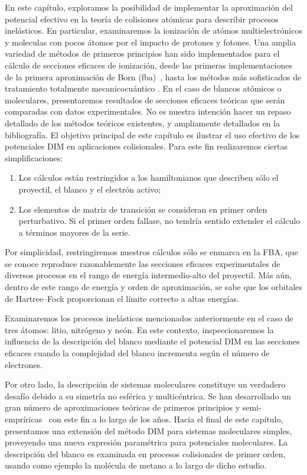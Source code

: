 En este capítulo, exploramos la posibilidad de implementar la 
aproximación del potencial efectivo en la teoría de colisiones atómicas 
para describir procesos inelásticos. En particular, examinaremos la 
ionización de atómos multielectrónicos y moleculas con pocos átomos por 
el impacto de protones y fotones. 
Una amplia variedad de métodos de primeros principios han sido 
implementados para el cálculo de secciones eficaces de ionización, 
desde las primeras implementaciones de la primera aproximación de Born (\acs{fba})~\cite{Bates:62,McDowell:61}, hasta los métodos más 
sofisticados de tratamiento totalmente mecanicocuántico 
\cite{Pindzola:07,Burke:11,Bray:17,Pindzola:16}. En el caso de 
blancos atómicos o moleculares, presentaremos resultados de secciones 
eficaces teóricas que serán comparadas con datos experimentales. No es 
nuestra intención hacer un repaso detallado de los métodos teóricos 
existentes, y ampliamente detallados en la bibliografía. El objetivo 
principal de este capítulo es ilustrar el uso efectivo de los 
potenciales DIM en aplicaciones colisionales. Para este fin realizaremos 
ciertas simplificaciones: 
\begin{enumerate}
\item Los cálculos están restringidos a los hamiltonianos que describen
sólo el proyectil, el blanco y el electrón activo;
\item Los elementos de matriz de transición se consideran en primer 
orden perturbativo. Si el primer orden fallase, no tendría sentido 
extender el cálculo a términos mayores de la serie. 
\end{enumerate}
Por simplicidad, restringiremos nuestros cálculos sólo se enmarca en
la FBA, que se conoce reproduce razonablemente las secciones eficaces
experimentales de diversos procesos en el rango de energía 
intermedio-alto del proyectil. Más aún, dentro de este rango de energía 
y orden de aproximación, se sabe que los orbitales de Hartree--Fock 
proporcionan el límite correcto a altas energías.

Examinaremos los procesos inelásticos mencionados anteriormente en 
el caso de tres átomos: litio, nitrógeno y neón. En este contexto,
inspeccionaremos la influencia de la descripción del blanco mediante
el potencial DIM en las secciones eficaces cuando la complejidad del 
blanco incrementa según el número de electrones.

Por otro lado, la descripción de sistemas moleculares constituye un 
verdadero desafío debido a su simetría no esférica y multicéntrica. 
Se han desarrollado un gran número de aproximaciones teóricas de 
primeros principios y semi-empríricas~\cite{Szabo:96,Helgaker:00,Schaefer:04} 
con este fin a lo largo de los años. Hacia el final de este capítulo, 
presentamos una extensión del método DIM para sistemas moleculares 
simples, proveyendo una nueva expresión paramétrica para potenciales 
moleculares. La descripción del blanco es examinada en procesos 
colisionales de primer orden, usando como ejemplo la molécula de metano 
a lo largo de dicho estudio.

